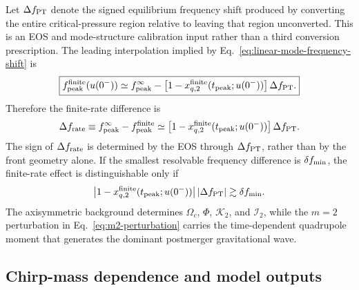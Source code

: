 \documentclass[11pt]{article}
\begin{document}
Let \(\Delta f_{\rm PT}\) denote the signed equilibrium frequency shift produced by converting the entire critical-pressure region relative to leaving that region unconverted.
This is an EOS and mode-structure calibration input rather than a third conversion prescription.
The leading interpolation implied by Eq.~\eqref{eq:linear-mode-frequency-shift} is
\begin{equation}
\boxed{
f_{\rm peak}^{\rm finite}(u(0^-))
\simeq
f_{\rm peak}^{\infty}
-
\left[
1-x_{q,2}^{\rm finite}(t_{\rm peak};u(0^-))
\right]
\Delta f_{\rm PT}.
}
\label{eq:generic-finite-peak-frequency}
\end{equation}
Therefore the finite-rate difference is
\begin{equation}
\Delta f_{\rm rate}
\equiv
f_{\rm peak}^{\infty}
-
f_{\rm peak}^{\rm finite}
\simeq
\left[
1-x_{q,2}^{\rm finite}(t_{\rm peak};u(0^-))
\right]
\Delta f_{\rm PT}.
\label{eq:generic-rate-frequency-shift}
\end{equation}
The sign of \(\Delta f_{\rm rate}\) is determined by the EOS through \(\Delta f_{\rm PT}\), rather than by the front geometry alone.
If the smallest resolvable frequency difference is \(\delta f_{\rm min}\), the finite-rate effect is distinguishable only if
\begin{equation}
\left|
1-x_{q,2}^{\rm finite}(t_{\rm peak};u(0^-))
\right|
\left|\Delta f_{\rm PT}\right|
\gtrsim
\delta f_{\rm min}.
\label{eq:generic-observable-criticality}
\end{equation}
The axisymmetric background determines \(\Omega_c\), \(\Phi\), \(\mathcal K_2\), and \(\mathcal I_2\), while the \(m=2\) perturbation in Eq.~\eqref{eq:m2-perturbation} carries the time-dependent quadrupole moment that generates the dominant postmerger gravitational wave.

\subsection{Chirp-mass dependence and model outputs}
\label{sec:gw-chirp-mass}
\end{document}
